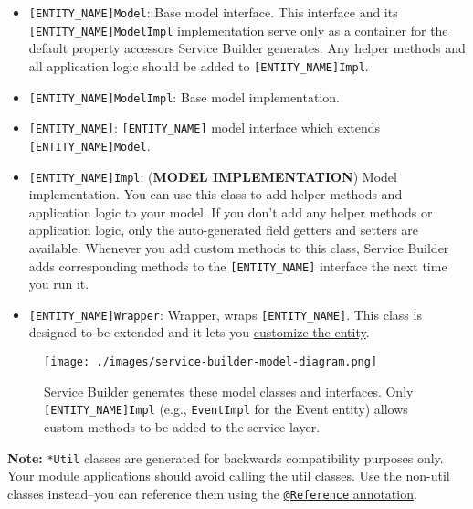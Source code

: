 \begin{itemize}
  \begin{itemize}
  \tightlist
  \item
    \texttt{{[}ENTITY\_NAME{]}Model}: Base model interface. This
    interface and its \texttt{{[}ENTITY\_NAME{]}ModelImpl}
    implementation serve only as a container for the default property
    accessors Service Builder generates. Any helper methods and all
    application logic should be added to
    \texttt{{[}ENTITY\_NAME{]}Impl}.
  \item
    \texttt{{[}ENTITY\_NAME{]}ModelImpl}: Base model implementation.
  \item
    \texttt{{[}ENTITY\_NAME{]}}: \texttt{{[}ENTITY\_NAME{]}} model
    interface which extends \texttt{{[}ENTITY\_NAME{]}Model}.
  \item
    \texttt{{[}ENTITY\_NAME{]}Impl}: (\textbf{MODEL IMPLEMENTATION})
    Model implementation. You can use this class to add helper methods
    and application logic to your model. If you don't add any helper
    methods or application logic, only the auto-generated field getters
    and setters are available. Whenever you add custom methods to this
    class, Service Builder adds corresponding methods to the
    \texttt{{[}ENTITY\_NAME{]}} interface the next time you run it.
  \item
    \texttt{{[}ENTITY\_NAME{]}Wrapper}: Wrapper, wraps
    \texttt{{[}ENTITY\_NAME{]}}. This class is designed to be extended
    and it lets you
    \href{/docs/7-2/customization/-/knowledge_base/c/overriding-service-builder-services-service-wrappers}{customize
    the entity}.
  \end{itemize}
\end{itemize}

\begin{figure}
\centering
\texttt{[image: ./images/service-builder-model-diagram.png]}
\caption{Service Builder generates these model classes and interfaces.
Only \texttt{{[}ENTITY\_NAME{]}Impl} (e.g., \texttt{EventImpl} for the
Event entity) allows custom methods to be added to the service layer.}
\end{figure}

\noindent\hrulefill

\textbf{Note:} \texttt{*Util} classes are generated for backwards
compatibility purposes only. Your module applications should avoid
calling the util classes. Use the non-util classes instead--you can
reference them using the
\href{/docs/7-2/frameworks/-/knowledge_base/f/declarative-services}{\texttt{@Reference}
annotation}.

